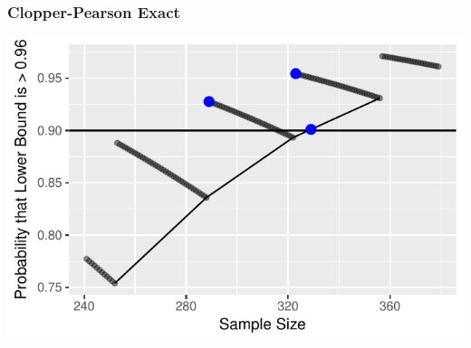 \documentclass{beamer}\usepackage{knitr}
\begin{document}
\begin{frame}
\frametitle{Clopper-Pearson Exact}
\begin{knitrout}
\color{fgcolor}

{\centering \includegraphics[width=\linewidth]{figure/plot_Exact_4-1} 

}



\end{knitrout}
\end{frame}




% 
% 
\end{document}
